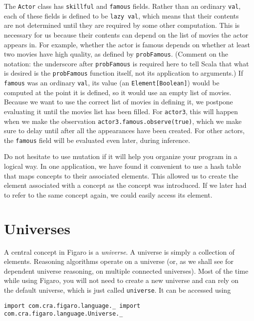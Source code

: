 The \texttt{Actor} class has \texttt{skillful} and \texttt{famous} fields. Rather than an ordinary \texttt{val}, each of these fields is defined to be \texttt{lazy val}, which means that their contents are not determined until they are required by some other computation. This is necessary for us because their contents can depend on the list of movies the actor appears in. For example, whether the actor is famous depends on whether at least two movies have high quality, as defined by \texttt{probFamous}. (Comment on the notation: the underscore after \texttt{probFamous} is required here to tell Scala that what is desired is the \texttt{probFamous} function itself, not its application to arguments.)   If \texttt{famous} was an ordinary \texttt{val}, its value (an \texttt{Element[Boolean]}) would be computed at the point it is defined, so it would use an empty list of movies. Because we want to use the correct list of movies in defining it, we postpone evaluating it until the movies list has been filled. For \texttt{actor3}, this will happen when we make the observation \texttt{actor3.famous.observe(true)}, which we make sure to delay until after all the appearances have been created. For other actors, the \texttt{famous} field will be evaluated even later, during inference.

Do not hesitate to use mutation if it will help you organize your program in a logical way. In one application, we have found it convenient to use a hash table that maps concepts to their associated elements. This allowed us to create the element associated with a concept as the concept was introduced. If we later had to refer to the same concept again, we could easily access its element.

\section{Universes}

A central concept in Figaro is a \emph{universe}. A universe is simply a collection of elements. Reasoning algorithms operate on a universe (or, as we shall see for dependent universe reasoning, on multiple connected universes). Most of the time while using Figaro, you will not need to create a new universe and can rely on the default universe, which is just called \texttt{universe}. It can be accessed using

\begin{flushleft}
\texttt{import com.cra.figaro.language.\_
\newline import com.cra.figaro.language.Universe.\_}
\end{flushleft}

